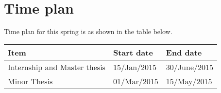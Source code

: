 \section{Time plan}
Time plan for this spring is as shown in the table below.
  \begin{table}[h]
  \begin{tabular}{|l|l|l|}
  \hline
  Item & Start date & End date \\ \hline
  Internship and Master thesis & 15/Jan/2015 & 30/June/2015 \\ \hline
  Minor Thesis & 01/Mar/2015 & 15/May/2015 \\ \hline
  \end{tabular}
  \end{table}
  
  